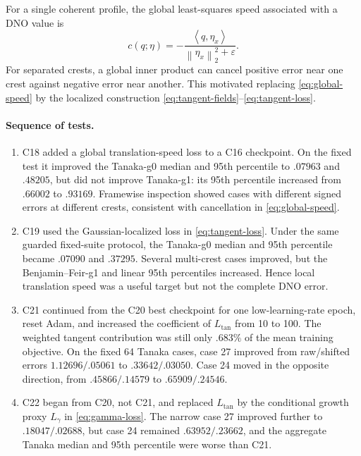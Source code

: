 \documentclass[11pt]{article}
\newcommand{\norm}[1]{\left\lVert #1\right\rVert}
\newcommand{\inner}[2]{\left\langle #1,#2\right\rangle}
\begin{document}
For a single coherent profile, the global least-squares speed associated with
a DNO value is
\begin{equation}
  c(q;\eta)=-\frac{\inner{q}{\eta_x}}
  {\norm{\eta_x}_2^2+\varepsilon}.
  \label{eq:global-speed}
\end{equation}
For separated crests, a global inner product can cancel positive error near
one crest against negative error near another.  This motivated replacing
\eqref{eq:global-speed} by the localized construction
\eqref{eq:tangent-fields}--\eqref{eq:tangent-loss}.

\paragraph{Sequence of tests.}
\begin{enumerate}[leftmargin=*]
  \item C18 added a global translation-speed loss to a C16 checkpoint.  On the
  fixed test it improved the Tanaka-g0 median and 95th percentile to $.07963$
  and $.48205$, but did not improve Tanaka-g1: its 95th percentile increased
  from $.66002$ to $.93169$.  Framewise inspection showed cases with different
  signed errors at different crests, consistent with cancellation in
  \eqref{eq:global-speed}.

  \item C19 used the Gaussian-localized loss in \eqref{eq:tangent-loss}.  Under
  the same guarded fixed-suite protocol, the Tanaka-g0 median and 95th
  percentile became $.07090$ and $.37295$.  Several multi-crest cases improved,
  but the Benjamin--Feir-g1 and linear 95th percentiles increased.  Hence local
  translation speed was a useful target but not the complete DNO error.

  \item C21 continued from the C20 best checkpoint for one low-learning-rate
  epoch, reset Adam, and increased the coefficient of $L_{\mathrm{tan}}$ from
  10 to 100.  The weighted tangent contribution was still only $.683\%$ of the
  mean training objective.  On the fixed 64 Tanaka cases, case 27 improved
  from raw/shifted errors $1.12696/.05061$ to $.33642/.03050$.  Case 24 moved
  in the opposite direction, from $.45866/.14579$ to $.65909/.24546$.

  \item C22 began from C20, not C21, and replaced $L_{\mathrm{tan}}$ by the
  conditional growth proxy $L_\gamma$ in \eqref{eq:gamma-loss}.  The narrow
  case 27 improved further to $.18047/.02688$, but case 24 remained
  $.63952/.23662$, and the aggregate Tanaka median and 95th percentile were
  worse than C21.
\end{enumerate}
\end{document}
